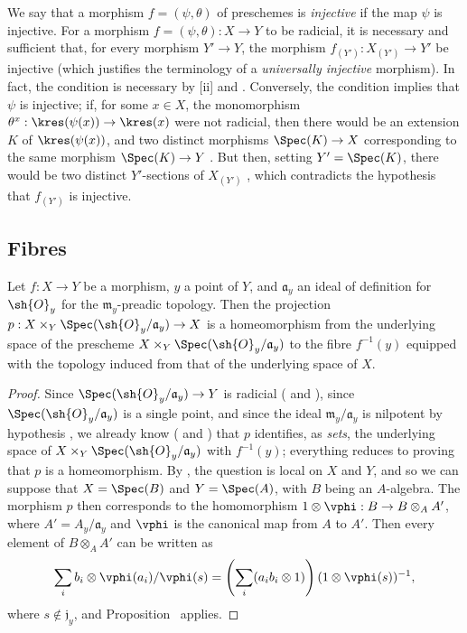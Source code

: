 \begin{remark}[3.5.11]
\label{I.3.5.11}
We say that a morphism $f=(\psi,\theta)$ of preschemes is \emph{injective} if the map $\psi$ is injective.
For a morphism $f=(\psi,\theta):X\to Y$ to be radicial, it is necessary and sufficient that, for every morphism $Y'\to Y$, the morphism $f_{(Y')}:X_{(Y')}\to Y'$ be injective (which justifies the terminology of a \emph{universally injective} morphism).
In fact, the condition is necessary by [ii] and .
Conversely, the condition implies that $\psi$ is injective; if, for some $x\in X$, the monomorphism $\theta^x:\kres(\psi(x))\to\kres(x)$ were not radicial, then there would be an extension $K$ of $\kres(\psi(x))$, and two distinct morphisms $\Spec(K)\to X$ corresponding to the same morphism $\Spec(K)\to Y$ .
But then, setting $Y'=\Spec(K)$, there would be two distinct $Y'$-sections of $X_{(Y')}$ , which contradicts the hypothesis that $f_{(Y')}$ is injective.
\end{remark}

\subsection{Fibres}
\label{subsection:I.3.6}

\begin{proposition}[3.6.1]
\label{I.3.6.1}
Let $f:X\to Y$ be a morphism, $y$ a point of $Y$, and $\mathfrak{a}_y$ an ideal of definition for $\sh{O}_y$ for the $\mathfrak{m}_y$-preadic topology.
Then the projection $p:X\times_Y\Spec(\sh{O}_y/\mathfrak{a}_y)\to X$ is a homeomorphism from the underlying space of the prescheme $X\times_Y\Spec(\sh{O}_y/\mathfrak{a}_y)$ to the fibre $f^{-1}(y)$ equipped with the topology induced from that of the underlying space of $X$.
\end{proposition}

\begin{proof}
Since $\Spec(\sh{O}_y/\mathfrak{a}_y)\to Y$ is radicial ( and ), since $\Spec(\sh{O}_y/\mathfrak{a}_y)$ is a single point, and since the ideal $\mathfrak{m}_y/\mathfrak{a}_y$ is nilpotent by hypothesis , we already know ( and ) that $p$ identifies, as \emph{sets}, the underlying space of $X\times_Y\Spec(\sh{O}_y/\mathfrak{a}_y)$ with $f^{-1}(y)$; everything reduces to proving that $p$ is a homeomorphism.
By , the question is local on $X$ and $Y$, and so we can suppose that $X=\Spec(B)$ and $Y=\Spec(A)$, with $B$ being an $A$-algebra.
The morphism $p$ then corresponds to the homomorphism $1\otimes\vphi:B\to B\otimes_A A'$, where $A'=A_y/\mathfrak{a}_y$ and $\vphi$ is the canonical map from $A$ to $A'$.
Then every element of $B\otimes_A A'$ can be written as
\[
  \sum_i b_i\otimes\vphi(a_i)/\vphi(s)=\left(\sum_i(a_ib_i\otimes1)\right)(1\otimes\vphi(s))^{-1},
\]
where $s\not\in\mathfrak{j}_y$, and Proposition~ applies.
\end{proof}

